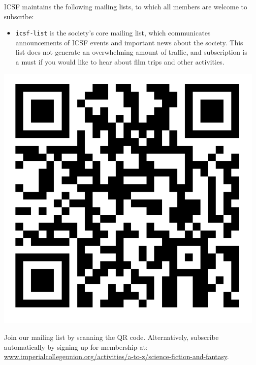 

ICSF maintains the following mailing lists, to which all members are welcome to
subscribe:

\begin{itemize}
\item \texttt{icsf-list}
is the society’s core mailing list, which communicates announcements
of ICSF events and important news about the society. This list does
not generate an overwhelming amount of traffic, and subscription is a
must if you would like to hear about film trips and other activities.

\end{itemize}

\begin{minipage}[h]{7.8em}
\includegraphics[height=\textwidth]{img/info/qr-mailing-list.png}
\end{minipage}
\begin{minipage}[h]{0.82\linewidth}
\raggedright
Join our mailing list by scanning the QR code. Alternatively, subscribe automatically by signing up for membership at: 
\href{https://www.imperialcollegeunion.org/activities/a-to-z/science-fiction-and-fantasy}{www.imperialcollegeunion.org/activities/a-to-z/science-fiction-and-fantasy}.
\end{minipage}


